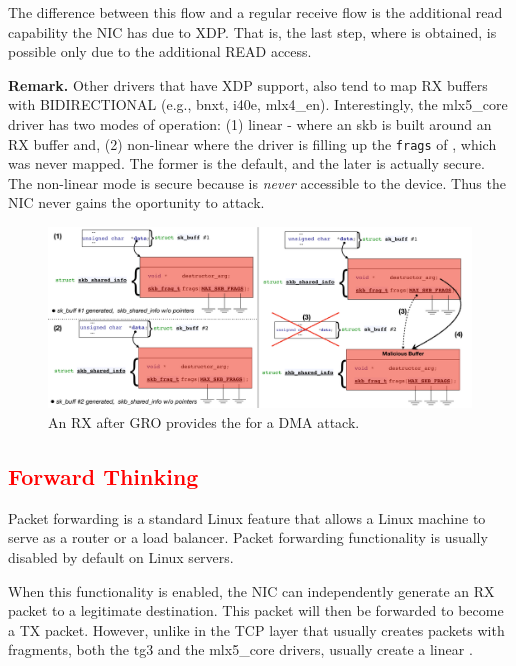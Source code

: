 The difference between this flow and a regular receive flow is the additional read capability the NIC has due to XDP. That is, the last step, where \kva is obtained, is possible only due to the additional READ access.

\smallskip
\noindent\textbf{Remark.} Other drivers that have XDP support, also tend to map RX buffers with BIDIRECTIONAL (e.g., bnxt, i40e, mlx4\_en). Interestingly, the mlx5\_core driver has two modes of operation: (1) linear - where an skb is built around an RX buffer and, (2) non-linear where the driver is filling up the \texttt{frags} of \shinfo, which was never mapped. The former is the default, and the later is actually secure. The non-linear mode is secure because \shinfo{} is \emph{never} accessible to the device. Thus the NIC never gains the oportunity to attack.

\begin{figure}[t]
    \centering
    \includegraphics[width=\linewidth]{figs/gro.pdf}
    \caption{An RX \skb{} after GRO provides the \kva{} for a DMA attack.}
    \label{fig:gro_xdp}
\end{figure}

\subsection{\textcolor{red}{\textbf{Forward Thinking}}}\label{sec:forward}

Packet forwarding is a standard Linux feature that allows a Linux machine to serve as a router or a load balancer. Packet forwarding functionality is usually disabled by default on Linux servers.

When this functionality is enabled, the NIC can independently generate an RX packet to a legitimate destination. This packet will then be forwarded to become a TX packet. However, unlike in the TCP layer that usually creates \skb{} packets with fragments, both the tg3 and the mlx5\_core drivers, usually create a linear \skb{}.

